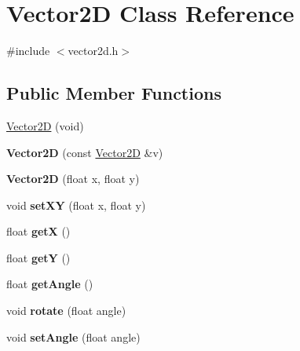 \hypertarget{class_vector2_d}{
\section{Vector2D Class Reference}
\label{class_vector2_d}
}


{\ttfamily \#include $<$vector2d.h$>$}

\subsection*{Public Member Functions}
\begin{DoxyCompactItemize}
\item 
\hyperlink{class_vector2_d_a0cbd5dc90e04f8ffb665717ae503e781}{Vector2D} (void)
\item 
\hypertarget{class_vector2_d_a68c8555c932b512c1b371e76c5ee9698}{
{\bfseries Vector2D} (const \hyperlink{class_vector2_d}{Vector2D} \&v)}
\label{class_vector2_d_a68c8555c932b512c1b371e76c5ee9698}

\item 
\hypertarget{class_vector2_d_a166ca1df158a260a7cbf3b57ff147a4a}{
{\bfseries Vector2D} (float x, float y)}
\label{class_vector2_d_a166ca1df158a260a7cbf3b57ff147a4a}

\item 
\hypertarget{class_vector2_d_a7942b2a5335e19c7ddd509d37a620ae9}{
void {\bfseries setXY} (float x, float y)}
\label{class_vector2_d_a7942b2a5335e19c7ddd509d37a620ae9}

\item 
\hypertarget{class_vector2_d_a527601e47976bcfdac2520817bfee675}{
float {\bfseries getX} ()}
\label{class_vector2_d_a527601e47976bcfdac2520817bfee675}

\item 
\hypertarget{class_vector2_d_a5b797fb62a3c21ced0cc8e27afd62f8b}{
float {\bfseries getY} ()}
\label{class_vector2_d_a5b797fb62a3c21ced0cc8e27afd62f8b}

\item 
\hypertarget{class_vector2_d_ae4150deda44f947176ab4f4e98e3f821}{
float {\bfseries getAngle} ()}
\label{class_vector2_d_ae4150deda44f947176ab4f4e98e3f821}

\item 
\hypertarget{class_vector2_d_af11f6edcb8e93949ab54b860a581bc1f}{
void {\bfseries rotate} (float angle)}
\label{class_vector2_d_af11f6edcb8e93949ab54b860a581bc1f}

\item 
\hypertarget{class_vector2_d_aefa64f76632b5036c1b6f249ad423e89}{
void {\bfseries setAngle} (float angle)}
\label{class_vector2_d_aefa64f76632b5036c1b6f249ad423e89}


\end{DoxyCompactItemize}
